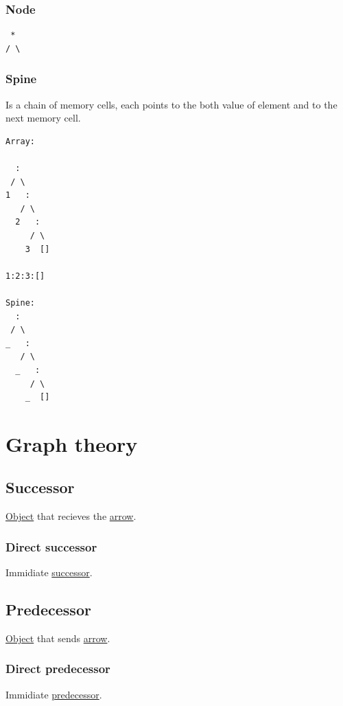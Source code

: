 \documentclass[a4paper,14pt,oneside]{book}
\begin{document}
\subsection{\label{org407ea23}Node}
\label{sec:orgcb3d203}
\begin{verbatim}
 *
/ \
\end{verbatim}

\subsection{\label{org9553dbc}Spine}
\label{sec:org4e89301}
Is a chain of memory cells, each points to the both value of element and to the next memory cell.
\begin{verbatim}
Array:

  :
 / \
1   :
   / \
  2   :
     / \
    3  []

1:2:3:[]

Spine:
  :
 / \
_   :
   / \
  _   :
     / \
    _  []

\end{verbatim}

\chapter{\label{org18a2818}Graph theory}
\label{sec:orgb0ee757}
\section{\label{org6abd13d}Successor}
\label{sec:org929e831}
\hyperref[orgf1eb672]{Object} that recieves the \hyperref[org116c928]{arrow}.

\subsection{\label{org9ca69cc}Direct successor}
\label{sec:orgf55962b}
Immidiate \hyperref[org6abd13d]{successor}.

\section{\label{orgb6e6f5d}Predecessor}
\label{sec:org3099342}
\hyperref[orgf1eb672]{Object} that sends \hyperref[org116c928]{arrow}.

\subsection{\label{org23640fb}Direct predecessor}
\label{sec:orgf522dfc}
Immidiate \hyperref[orgb6e6f5d]{predecessor}.
\end{document}
